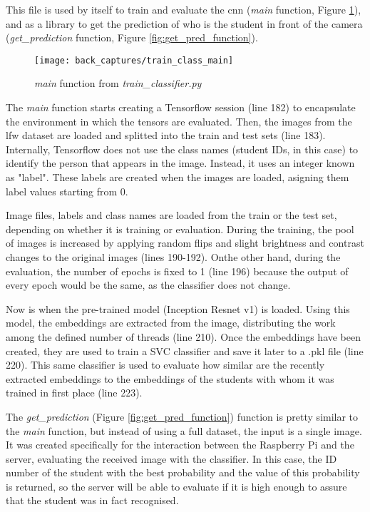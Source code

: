 	This file is used by itself to train and evaluate the \gls{cnn} (\textit{main} function, Figure \ref{fig:train_classifier_main}), and as a library to get the prediction of who is the student in front of the camera (\textit{get{\_}prediction} function, Figure \ref{fig:get_pred_function}). 

	\begin{figure}[!ht]
		\centering
		\texttt{[image: back\_captures/train\_class\_main]}
		\caption{\textit{main} function from \textit{train{\_}classifier.py}}
		\label{fig:train_classifier_main}
	\end{figure}

	The \textit{main} function starts creating a Tensorflow session (line 182) to encapsulate the environment in which the tensors are evaluated. Then, the images from the \gls{lfw} dataset are loaded and splitted into the train and test sets (line 183). Internally, Tensorflow does not use the class names (student IDs, in this case) to identify the person that appears in the image. Instead, it uses an integer known as "label". These labels are created when the images are loaded, asigning them label values starting from 0.  

	Image files, labels and class names are loaded from the train or the test set, depending on whether it is training or evaluation. During the training, the pool of images is increased by applying random flips and slight brightness and contrast changes to the original images (lines 190-192). Onthe other hand, during the evaluation, the number of \glspl{epoch} is fixed to 1 (line 196) because the output of every epoch would be the same, as the classifier does not change.

	Now is when the pre-trained model (Inception Resnet v1) is loaded. Using this model, the \glspl{embedding} are extracted from the image, distributing the work among the defined number of threads (line 210). Once the embeddings have been created, they are used to train a SVC classifier and save it later to a .pkl file (line 220). This same classifier is used to evaluate how similar are the recently extracted embeddings to the embeddings of the students with whom it was trained in first place (line 223).

	The \textit{get{\_}prediction} (Figure \ref{fig:get_pred_function}) function is pretty similar to the \textit{main} function, but instead of using a full dataset, the input is a single image. It was created specifically for the interaction between the Raspberry Pi and the server, evaluating the received image with the classifier. In this case, the ID number of the student with the best probability and the value of this probability is returned, so the server will be able to evaluate if it is high enough to assure that the student was in fact recognised.

